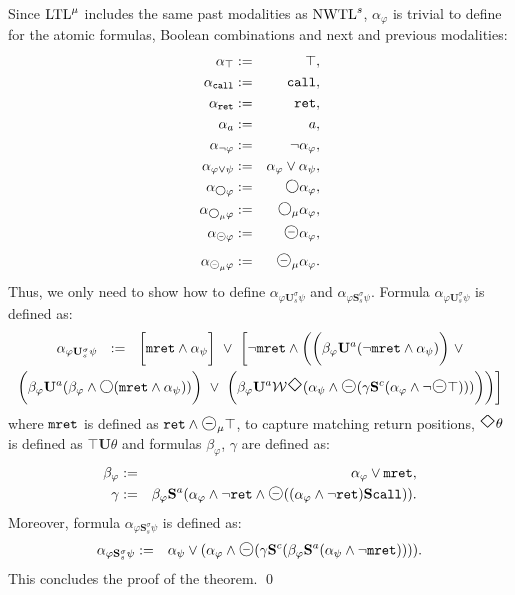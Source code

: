 \documentclass{LMCS}
\newcommand{\M}{{\mu}}
\newcommand{\dm}{\Diamond}
\newcommand{\WW}{{\mathcal{W}}}
\newcommand{\U}{{\mathbf U}}
\renewcommand{\S}{{\mathbf S}}
\newcommand{\next}{\text{\raisebox{1pt}{$\bigcirc$}}}
\renewcommand{\phi}{\varphi}
\theoremstyle{plain}
\theoremstyle{definition}
\newcommand{\ppath}{\sigma} \newcommand{\Ul}{\U}
\newcommand{\Sl}{\S}
\newcommand{\Sc}{\S^c}
\newcommand{\Ur}{\U^a}
\newcommand{\Sr}{\S^a}
\newcommand{\Up}{\U^\ppath}
\newcommand{\Sp}{\S^\ppath}
\newcommand{\Us}{\Up_s}
\newcommand{\Ss}{\Sp_s}
\newcommand{\true}{\top}
\newcommand{\eventually}{\text{\Large $\Diamond$}}
\newcommand{\prev}{{\text{\Large $\mathbf{\circleddash}$}}}
\newcommand{\retr}{\mathit{ret}}
\newcommand{\mret}{{\tt{mret}}}
\newcommand{\ltlv}{\text{\rm LTL}^\M}
\newcommand{\ltlvp}{\ltlv}\newcommand{\nwtl}{\text{\rm NWTL}}
\newcommand{\nwtls}{\nwtl^s}
\newcommand{\rett}{{\tt ret}}
\newcommand{\call}{{\tt call}}
\renewcommand{\retr}{\rett}
\newcommand{\dmm}{\dm_{\M}}
\newcommand{\dmminus}{\dm^-}
\newcommand{\dmmminus}{\dm_{\M}^-}
\renewcommand{\dm}{\next}
\renewcommand{\dmminus}{\prev}
\renewcommand{\dmm}{\dm_\M}
\renewcommand{\dmmminus}{\dmminus_{\M}}
\begin{document}
Since $\ltlvp$ includes the same past modalities as $\nwtls$,
$\alpha_\varphi$ is trivial to define for the atomic formulas, Boolean
combinations and next and previous modalities:
\begin{eqnarray*}
\alpha_{\true} & := & \true,\\
\alpha_{\call} & := & \call,\\
\alpha_{\retr} & := & \retr,\\
\alpha_a & := & a,\\
\alpha_{\neg \phi} & := & \neg \alpha_\phi,\\
\alpha_{\phi \vee \psi} & := & \alpha_\phi \vee \alpha_\psi,\\
\alpha_{\dm \phi} & := &  \dm \alpha_\phi,\\
\alpha_{\dmm \phi} & := & \dmm \alpha_\phi,\\
\alpha_{\text{\mbox{\small $\circleddash$}} \phi} & := & \dmminus \alpha_\phi,\\
\alpha_{\text{\mbox{\small $\circleddash$}}_\M \phi} & := & \dmmminus \alpha_\phi.
\end{eqnarray*}
Thus, we only need to show how to define $\alpha_{\phi \Us \psi}$ and
$\alpha_{\phi \Ss \psi}$. Formula $\alpha_{\phi \Us \psi}$ is defined as: 
\begin{multline*}
\alpha_{\phi \Us \psi} \ \ := \  \ \bigg[\mret \wedge
\alpha_\psi\bigg] \ \vee \  \bigg[\neg \mret \wedge 
\bigg(\bigg(\beta_\varphi \Ur (\neg \mret \wedge \alpha_\psi)\bigg) 
\ \vee \\ 
\bigg(\beta_\varphi \Ur (\beta_\varphi \wedge \dm (\mret \wedge
\alpha_\psi))\bigg) \ \vee \ 
\bigg(\beta_\varphi \Ur \WW \eventually (\alpha_\psi \wedge \dmminus
(\gamma \Sc (\alpha_\varphi \wedge \neg \dmminus
\top)))\bigg)\bigg)\bigg]   
\end{multline*}
where $\mret$ is defined as $\retr\wedge\prev_{\M}\top$, to capture
matching return positions, $\eventually \theta$ is defined as $\top \U
\theta$ and formulas $\beta_\varphi$, $\gamma$ are defined as:
\begin{eqnarray*}
\beta_\varphi & := & \alpha_\varphi \vee \mret,\\
\gamma & := & \beta_\varphi \Sr (\alpha_\varphi
\wedge \neg \retr \wedge \dmminus ((\alpha_\varphi \wedge \neg \retr)
\Sl \call)).
\end{eqnarray*}
Moreover, formula $\alpha_{\phi \Ss \psi}$ is defined as: 
\begin{eqnarray*}
\alpha_{\phi \Ss \psi} & := & \alpha_\psi \vee (\alpha_\varphi \wedge
\dmminus (\gamma \Sc (\beta_\varphi \Sr (\alpha_\psi \wedge \neg \mret)))).
\end{eqnarray*}
This concludes the proof of the theorem. \qed
\end{document}
